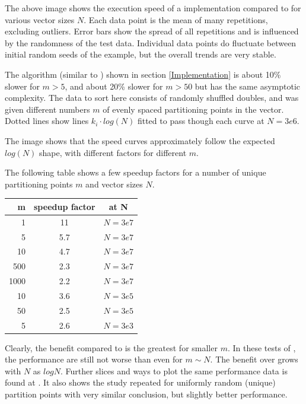 The above image shows the execution speed of a  implementation compared to  for various vector sizes $N$. 
Each data point is the mean of many repetitions, excluding outliers. Error bars show the spread of all repetitions and is influenced by the randomness of the test data. Individual data points do fluctuate between initial random seeds of the example, but the overall trends are very stable.

The  algorithm (similar to \cite{Alsuwaiyel2001}) shown in section \ref{Implementation} is about 10\% slower for $m>5$, and about 20\% slower for $m>50$ but has the same asymptotic complexity. The data to sort here consists of randomly shuffled doubles, and  was given different numbers $m$ of evenly spaced partitioning points in the vector. Dotted lines show lines $k_i \cdot log(N)$ fitted to pass though each curve at $N=3e6$. 

The image shows that the speed curves approximately follow the expected $log(N)$ shape, with different factors for different $m$.

The following table shows a few speedup factors for a number of unique partitioning points $m$ and vector sizes $N$. 

\begin{center}
\begin{tabular}{|r|c|c|} %
  \hline 
  \textbf{m} & \textbf{speedup factor} & \textbf{at N}\\
  \hline 
1 & 11 & $N=3e7$\\
5 & 5.7 & $N=3e7$\\
10 & 4.7 & $N=3e7$\\
500 & 2.3 & $N=3e7$\\
1000 & 2.2 & $N=3e7$\\
\hline
10 & 3.6 & $N=3e5$\\
50 & 2.5 & $N=3e5$\\
\hline
5 & 2.6 & $N=3e3$\\
  \hline 
\end{tabular}
\end{center}


Clearly, the benefit compared to   is the greatest for smaller $m$. In these tests of  , the performance are still not worse than  even for $m \sim N$. 
The benefit over  grows with $N$ as $log N$. Further slices and ways to plot the same performance data is found at \cite{p2375RefImpl}. It also shows the study repeated for uniformly random (unique) partition points with very similar conclusion, but slightly better performance.

